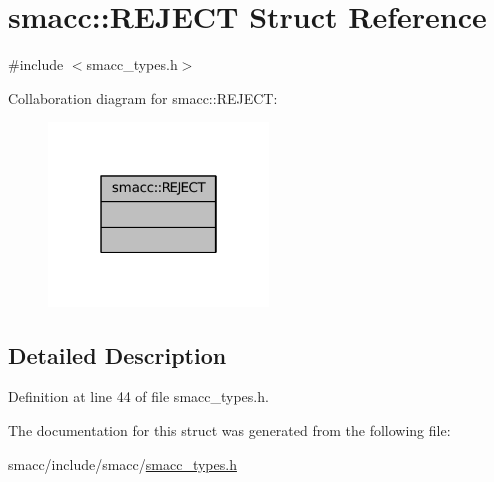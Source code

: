 \hypertarget{structsmacc_1_1REJECT}{}\section{smacc\+:\+:R\+E\+J\+E\+CT Struct Reference}
\label{structsmacc_1_1REJECT}


{\ttfamily \#include $<$smacc\+\_\+types.\+h$>$}



Collaboration diagram for smacc\+:\+:R\+E\+J\+E\+CT\+:
\nopagebreak
\begin{figure}[H]
\begin{center}
\leavevmode
\includegraphics[width=166pt]{structsmacc_1_1REJECT__coll__graph}
\end{center}
\end{figure}


\subsection{Detailed Description}


Definition at line 44 of file smacc\+\_\+types.\+h.



The documentation for this struct was generated from the following file\+:\begin{DoxyCompactItemize}
\item 
smacc/include/smacc/\hyperlink{smacc__types_8h}{smacc\+\_\+types.\+h}\end{DoxyCompactItemize}
